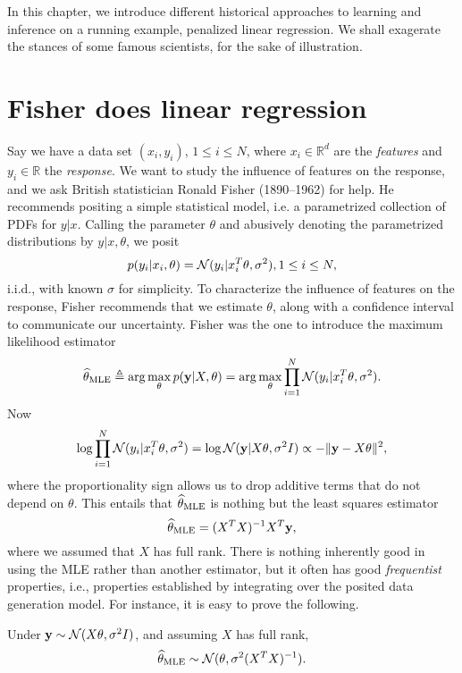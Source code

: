 In this chapter, we introduce different historical approaches to learning and inference on a running example, penalized linear regression. 
We shall exagerate the stances of some famous scientists, for the sake of illustration. 

\section{Fisher does linear regression}

Say we have a data set $(x_i,y_i)$, $1\leq i\leq N$, where $x_i\in\mathbb{R}^d$ are the \emph{features} and $y_i\in\mathbb{R}$ the \emph{response}. 
We want to study the influence of features on the response, and we ask British statistician Ronald Fisher (1890--1962) for help. 
He recommends positing a simple statistical model, i.e. a parametrized collection of PDFs for $y\vert x$. 
Calling the parameter $\theta$ and abusively denoting the parametrized distributions by $y\vert x,\theta$, we posit 
$$ p(y_i\vert x_i, \theta) = \mathcal{N}(y_i \vert x_i^T \theta, \sigma^2), 1\leq i \leq N,$$
i.i.d., with known $\sigma$ for simplicity.
To characterize the influence of features on the response, Fisher recommends that we estimate $\theta$, along with a confidence interval to communicate our uncertainty. 
Fisher was the one to introduce the maximum likelihood estimator 
$$
\widehat{\theta}_{\text{MLE}} \triangleq \arg\max_{\theta} p(\mathbf{y}\vert X, \theta) = \arg\max_\theta \prod_{i=1}^N \mathcal{N}(y_i \vert x_i^T \theta, \sigma^2).
$$
Now 
$$
\log \prod_{i=1}^N \mathcal{N}(y_i \vert x_i^T \theta, \sigma^2) = \log \mathcal{N}(\mathbf{y} \vert X\theta, \sigma^2 I) \propto - \Vert \mathbf{y} - X\theta\Vert^2,
$$
where the proportionality sign allows us to drop additive terms that do not depend on $\theta$. 
This entails that $\widehat{\theta}_{\text{MLE}}$ is nothing but the least squares estimator 
$$
\widehat{\theta}_{\text{MLE}} = (X^TX)^{-1} X^T\mathbf{y},
$$
where we assumed that $X$ has full rank.
There is nothing inherently good in using the MLE rather than another estimator, but it often has good \emph{frequentist} properties, i.e., properties established by integrating over the posited data generation model.
For instance, it is easy to prove the following.
\begin{proposition}
Under $\mathbf{y} \sim \mathcal{N}(X\theta, \sigma^2 I)$, and assuming $X$ has full rank,
\begin{equation}
    \label{e:fisher}
    \widehat{\theta}_{\text{MLE}} \sim \mathcal{N}(\theta, \sigma^2(X^TX)^{-1}).
\end{equation}
\end{proposition}
\proofLeftAsExercise

